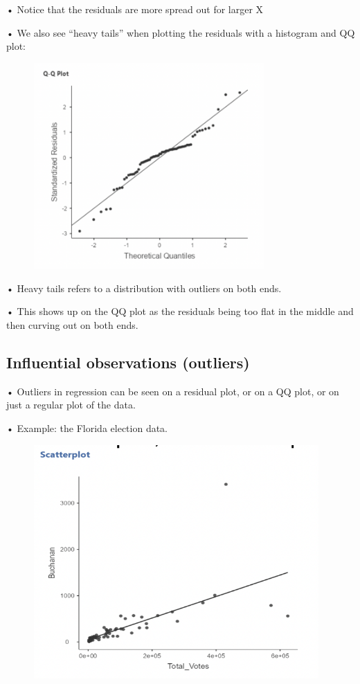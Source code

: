 \documentclass[
  letterpaper,
  DIV=11,
  numbers=noendperiod]{scrreprt}
\begin{document}
• Notice that the residuals are more spread out for larger X

• We also see ``heavy tails'' when plotting the residuals with a
histogram and QQ plot:

\begin{figure}

{\centering \includegraphics[width=3.45833in,height=\textheight]{images/mod4_pt1_17.png}

}

\end{figure}

• Heavy tails refers to a distribution with outliers on both ends.

• This shows up on the QQ plot as the residuals being too flat in the
middle and then curving out on both ends.

\hypertarget{influential-observations-outliers}{%
\subsection{Influential observations
(outliers)}\label{influential-observations-outliers}}

• Outliers in regression can be seen on a residual plot, or on a QQ
plot, or on just a regular plot of the data.

• Example: the Florida election data.

\begin{figure}

{\centering \includegraphics[width=4.28125in,height=\textheight]{images/mod4_pt1_18.png}

}

\end{figure}
\end{document}
